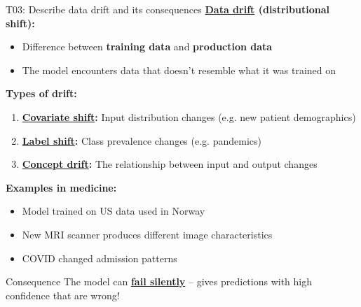 \documentclass[aspectratio=169, 10pt]{beamer}
\begin{document}
\begin{frame}{T03: Describe data drift and its consequences}
    \textbf{\href{https://en.wikipedia.org/wiki/Data_drift}{Data drift} (distributional shift):}
    \begin{itemize}
        \item Difference between \textbf{training data} and \textbf{production data}
        \item The model encounters data that doesn't resemble what it was trained on
    \end{itemize}
    
    \vspace{0.2cm}
    \textbf{Types of drift:}
    \begin{enumerate}
        \item \textbf{\href{https://en.wikipedia.org/wiki/Covariate_shift}{Covariate shift}:} Input distribution changes (e.g. new patient demographics)
        \item \textbf{\href{https://en.wikipedia.org/wiki/Label_shift}{Label shift}:} Class prevalence changes (e.g. pandemics)
        \item \textbf{\href{https://en.wikipedia.org/wiki/Concept_drift}{Concept drift}:} The relationship between input and output changes
    \end{enumerate}
    
    \vspace{0.2cm}
    \textbf{Examples in medicine:}
    \begin{itemize}
        \item Model trained on US data used in Norway
        \item New MRI scanner produces different image characteristics
        \item COVID changed admission patterns
    \end{itemize}
    
    {\small
    \begin{alertblock}{Consequence}
        The model can \textbf{\href{https://en.wikipedia.org/wiki/Silent_failure}{fail silently}} -- gives predictions with high confidence that are wrong!
    \end{alertblock}
    }
\end{frame}
\end{document}
